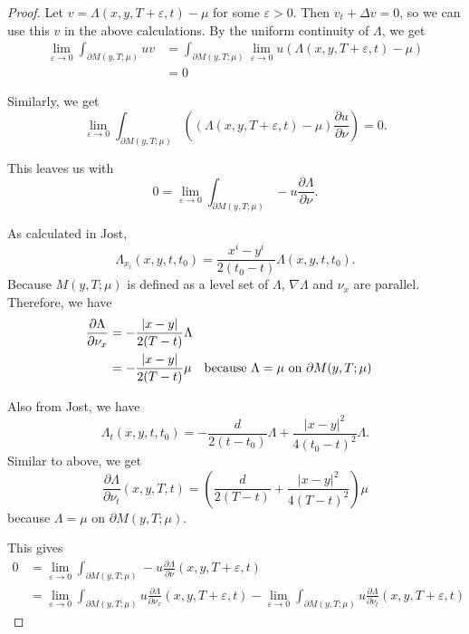 \documentclass[a4paper]{article}
\begin{document}
\begin{enumerate}
\begin{proof}
      Let $v = \Lambda(x,y,T+\varepsilon, t) - \mu$ for some $\varepsilon>0$. Then $v_t + \Delta v = 0$, so we can use this $v$ in the above
      calculations.
      By the uniform continuity of $\Lambda$, we get
      \begin{align*}
        \lim_{\varepsilon \to 0} \int_{\partial M(y,T;\mu)}^{} uv &= \int_{\partial M(y,T;\mu)}^{} \lim_{\varepsilon \to 0} u
        (\Lambda(x,y,T+\varepsilon,t) - \mu) \\
        &= 0
      \end{align*}

      Similarly, we get
      \[ \lim_{\varepsilon \to 0} \int_{\partial M(y,T;\mu)}^{} \left( (\Lambda(x,y,T+\varepsilon,t) - \mu) \frac{\partial u}{\partial \nu} \right) = 0 .\]

      This leaves us with
      \[ 0 = \lim_{\varepsilon \to 0} \int_{\partial M(y,T;\mu)}^{} -u \frac{\partial \Lambda}{\partial \nu} .\]

      As calculated in Jost,
      \[ \Lambda_{x_i} (x,y,t,t_0) = \frac{x^i - y^i}{2(t_0 - t)} \Lambda(x,y,t,t_0) .\]
      Because $M(y,T;\mu)$ is defined as a level set of $\Lambda$, $\nabla \Lambda$ and $\nu_x$ are parallel. Therefore, we have
      \begin{align*}
        \frac{\partial \Lambda}{\partial \nu_x} &= - \frac{|x-y|}{2(T-t)} \Lambda \\
        &= - \frac{|x-y|}{2(T-t)}\mu \quad \parbox{5cm}{because $\Lambda=\mu$ on $\partial M(y,T;\mu)$}
      \end{align*}

      Also from Jost, we have
      \[ \Lambda_t(x,y,t,t_0) = -\frac{d}{2(t-t_0)} \Lambda + \frac{|x-y|^2}{4(t_0-t)^2} \Lambda .\]
      Similar to above, we get
      \[ \frac{\partial \Lambda}{\partial \nu_t} (x,y,T,t) = \left( \frac{d}{2(T - t)} + \frac{|x-y|^2}{4(T -
      t)^2} \right) \mu \]
      because $\Lambda = \mu$ on $\partial M(y,T;\mu)$.

      This gives
      \begin{align*}
        0 &= \lim_{\varepsilon \to 0} \int_{\partial M(y,T;\mu)}^{} -u \frac{\partial \Lambda}{\partial \nu} (x,y,T+\varepsilon,t) \\
        &= \lim_{\varepsilon \to 0} \int_{\partial M(y,T;\mu)}^{} u \frac{\partial \Lambda}{\partial \nu_x} (x,y,T+\varepsilon,t) - \lim_{\varepsilon
        \to 0} \int_{\partial M(y,T;\mu)}^{} u \frac{\partial \Lambda}{\partial \nu_t} (x,y,T+\varepsilon,t)
      \end{align*}


\end{proof}
\end{enumerate}
\end{document}
